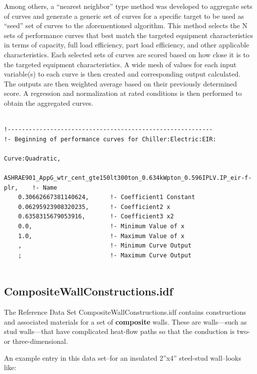 Among others, a ``nearest neighbor'' type method was developed to aggregate sets of curves and generate a generic set of curves for a specific target to be used as ``seed'' set of curves to the aforementioned algorithm. This method selects the N sets of performance curves that best match the targeted equipment characteristics in terms of capacity, full load efficiency, part load efficiency, and other applicable characteristics. Each selected sets of curves are scored based on how close it is to the targeted equipment characteristics. A wide mesh of values for each input variable(s) to each curve is then created and corresponding output calculated. The outputs are then weighted average based on their previously determined score. A regression and normalization at rated conditions is then performed to obtain the aggregated curves.

\begin{lstlisting}

!----------------------------------------------------------
!- Beginning of performance curves for Chiller:Electric:EIR:

Curve:Quadratic,
    ASHRAE901_AppG_wtr_cent_gte150lt300ton_0.634kWpton_0.596IPLV.IP_eir-f-plr,    !- Name
    0.30662667381140624,      !- Coefficient1 Constant
    0.06295923908320235,      !- Coefficient2 x
    0.6358315679053916,       !- Coefficient3 x2
    0.0,                      !- Minimum Value of x
    1.0,                      !- Maximum Value of x
    ,                         !- Minimum Curve Output
    ;                         !- Maximum Curve Output
  
\end{lstlisting}

\subsection{CompositeWallConstructions.idf}\label{compositewallconstructions.idf}

The Reference Data Set CompositeWallConstructions.idf contains constructions and associated materials for a set of \textbf{composite} walls. These are walls---such as stud walls---that have complicated heat-flow paths so that the conduction is two- or three-dimensional.

An example entry in this data set--for an insulated 2''x4'' steel-stud wall--looks like:

